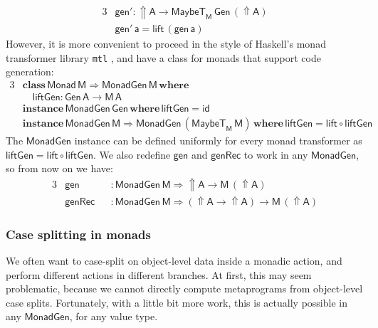 \documentclass[acmsmall,screen,review,anonymous]{acmart}
\newcommand{\mit}[1]{{\mathsf{#1}}}
\newcommand{\msf}[1]{{\mathsf{#1}}}
\newcommand{\mbf}[1]{{\mathbf{#1}}}
\newcommand{\ind}{\hspace{1em}}
\newcommand{\where}{\mbf{where}}
\newcommand{\M}{\msf{M}}
\newcommand{\vA}{\mathsf{A}}
\newcommand{\vM}{\mathsf{M}}
\newcommand{\va}{\mathsf{a}}
\newcommand{\Monad}{\msf{Monad}}
\newcommand{\Up}{{\Uparrow}}
\newcommand{\MaybeT}{\msf{MaybeT}}
\theoremstyle{remark}
\newcommand{\id}{\mit{id}}
\newcommand{\tyclass}{\mbf{class}}
\newcommand{\instance}{\mbf{instance}\,}
\newcommand{\Gen}{\msf{Gen}}
\newcommand{\gen}{\mit{gen}}
\newcommand{\genRec}{\mit{genRec}}
\newcommand{\lift}{\mit{lift}}
\newcommand{\liftGen}{\mit{liftGen}}
\newcommand{\MonadGen}{\msf{MonadGen}}
\newcommand{\RA}{\Rightarrow}
\begin{document}
\begin{alignat*}{3}
  &\gen' : \Up \vA \to \MaybeT_\M\,\Gen\,(\Up \vA) \\
  &\gen'\,\va = \lift\,(\gen\,\va)
\end{alignat*}
However, it is more convenient to proceed in the style of Haskell's monad
transformer library \texttt{mtl} \cite{mtl}, and have a class for monads that
support code generation:
\begin{alignat*}{3}
&\tyclass\,\Monad\,\vM \RA \MonadGen\,\vM\,\where\\
&\ind \liftGen : \Gen\,\vA \to \M\,\vA\\
&\instance \MonadGen\,\Gen\,\where\,\liftGen = \id \\
&\instance \MonadGen\,\vM \RA \MonadGen\,(\MaybeT_\M\,\vM)\,\where\,\liftGen = \lift \circ \liftGen
\end{alignat*}
The $\MonadGen$ instance can be defined uniformly for every monad transformer as
$\liftGen = \lift \circ \liftGen$. We also redefine $\gen$ and $\genRec$ to work
in any $\MonadGen$, so from now on we have:
\begin{alignat*}{3}
 &\gen   &&: \MonadGen\,\vM \RA \Up \vA \to \vM\,(\Up \vA)\\
 &\genRec &&: \MonadGen\,\vM \RA (\Up \vA \to \Up \vA) \to \vM\,(\Up \vA)
\end{alignat*}

\subsubsection{Case splitting in monads}
We often want to case-split on object-level data inside a monadic action, and
perform different actions in different branches. At first, this may seem
problematic, because we cannot directly compute metaprograms from object-level
case splits. Fortunately, with a little bit more work, this is actually possible
in any $\MonadGen$, for any value type.
\end{document}

